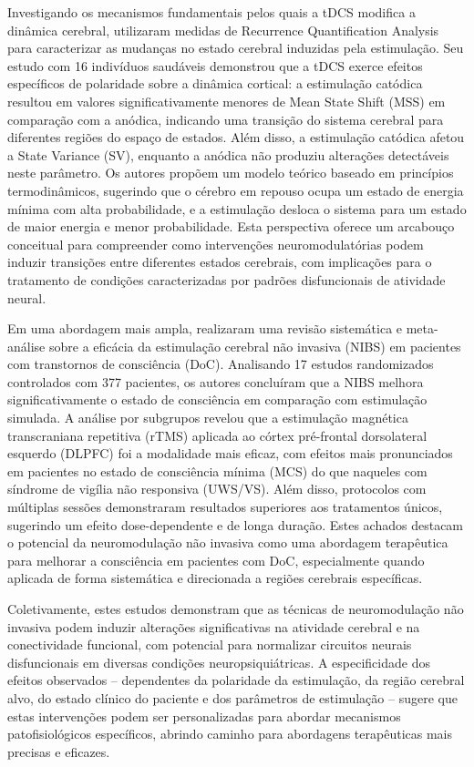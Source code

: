Investigando os mecanismos fundamentais pelos quais a tDCS modifica a dinâmica cerebral,  utilizaram medidas de Recurrence Quantification Analysis para caracterizar as mudanças no estado cerebral induzidas pela estimulação. Seu estudo com 16 indivíduos saudáveis demonstrou que a tDCS exerce efeitos específicos de polaridade sobre a dinâmica cortical: a estimulação catódica resultou em valores significativamente menores de Mean State Shift (MSS) em comparação com a anódica, indicando uma transição do sistema cerebral para diferentes regiões do espaço de estados. Além disso, a estimulação catódica afetou a State Variance (SV), enquanto a anódica não produziu alterações detectáveis neste parâmetro. Os autores propõem um modelo teórico baseado em princípios termodinâmicos, sugerindo que o cérebro em repouso ocupa um estado de energia mínima com alta probabilidade, e a estimulação desloca o sistema para um estado de maior energia e menor probabilidade. Esta perspectiva oferece um arcabouço conceitual para compreender como intervenções neuromodulatórias podem induzir transições entre diferentes estados cerebrais, com implicações para o tratamento de condições caracterizadas por padrões disfuncionais de atividade neural.

Em uma abordagem mais ampla,  realizaram uma revisão sistemática e meta-análise sobre a eficácia da estimulação cerebral não invasiva (NIBS) em pacientes com transtornos de consciência (DoC). Analisando 17 estudos randomizados controlados com 377 pacientes, os autores concluíram que a NIBS melhora significativamente o estado de consciência em comparação com estimulação simulada. A análise por subgrupos revelou que a estimulação magnética transcraniana repetitiva (rTMS) aplicada ao córtex pré-frontal dorsolateral esquerdo (DLPFC) foi a modalidade mais eficaz, com efeitos mais pronunciados em pacientes no estado de consciência mínima (MCS) do que naqueles com síndrome de vigília não responsiva (UWS/VS). Além disso, protocolos com múltiplas sessões demonstraram resultados superiores aos tratamentos únicos, sugerindo um efeito dose-dependente e de longa duração. Estes achados destacam o potencial da neuromodulação não invasiva como uma abordagem terapêutica para melhorar a consciência em pacientes com DoC, especialmente quando aplicada de forma sistemática e direcionada a regiões cerebrais específicas.

Coletivamente, estes estudos demonstram que as técnicas de neuromodulação não invasiva podem induzir alterações significativas na atividade cerebral e na conectividade funcional, com potencial para normalizar circuitos neurais disfuncionais em diversas condições neuropsiquiátricas. A especificidade dos efeitos observados – dependentes da polaridade da estimulação, da região cerebral alvo, do estado clínico do paciente e dos parâmetros de estimulação – sugere que estas intervenções podem ser personalizadas para abordar mecanismos patofisiológicos específicos, abrindo caminho para abordagens terapêuticas mais precisas e eficazes.

